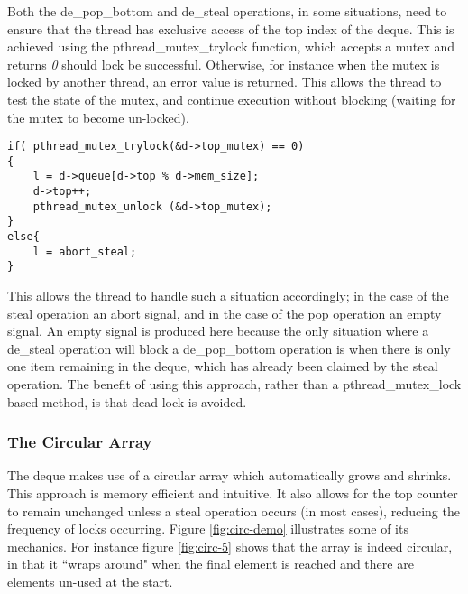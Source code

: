 Both the de\_pop\_bottom and de\_steal operations, in some situations, need to ensure that the thread has exclusive access of the 
top index of the deque.
This is achieved using the pthread\_mutex\_trylock function, which accepts a mutex and returns \textit{0} should lock be successful.
Otherwise, for instance when the mutex is locked by another thread, an error value is returned. This allows the thread to test the 
state of the mutex, and continue execution without blocking (waiting for the mutex to become un-locked).

\begin{lstlisting}[label=li:destrealtrylock,
caption=This excerpt taken from the code for the de\_steal operation shows how the pthread\_mutex\_trylock funciton is used to avoid blocking when the mutex is already locked. If the function returns \(0\) the mutex is available otherwise the else clause is taken.]
if( pthread_mutex_trylock(&d->top_mutex) == 0)
{
    l = d->queue[d->top % d->mem_size];
    d->top++;
    pthread_mutex_unlock (&d->top_mutex);
}
else{
    l = abort_steal;
}
\end{lstlisting}

This allows the thread to handle such a situation accordingly; in the case of the steal operation an abort signal, and in the case
of the pop operation an empty signal. An empty signal is produced here because the only situation where a de\_steal operation will block 
a de\_pop\_bottom operation is when there is only one item remaining in the deque, which has already been claimed by the steal operation.
The benefit of using this approach, rather than a pthread\_mutex\_lock based method, is that \gls{dead-lock} is avoided.

\subsubsection*{The Circular Array}



The deque makes use of a circular array which automatically grows and shrinks.
This approach is memory efficient and intuitive. 
It also allows for the top counter to remain unchanged unless a steal operation occurs (in most cases), reducing the frequency of locks occurring.
Figure \ref{fig:circ-demo} illustrates some of its mechanics. For instance figure \ref{fig:circ-5} shows that the array is indeed circular, in that it
``wraps around" when the final element is reached and there are elements un-used at the start.

